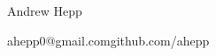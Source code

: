 \begin{center}
   \huge Andrew Hepp \normalsize
\end{center}
ahepp0@gmail.com\hfill github.com/ahepp
